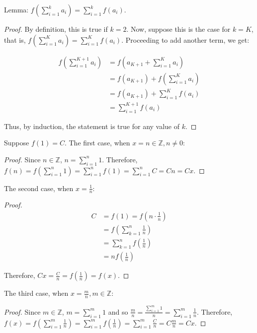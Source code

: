 
Lemma: $f\left(\sum_{i = 1}^k a_i\right) = \sum_{i = 1}^k f(a_i)$.
\begin{proof}
  By definition, this is true if $k = 2$. Now, suppose this is the case for $k = K$, that is, $f\left(\sum_{i = 1}^K a_i\right) = \sum_{i = 1}^K f(a_i)$. Proceeding to add another term, we get:

  \begin{align*}
    f\left(\sum_{i = 1}^{K + 1} a_i\right) &= f\left(a_{K + 1} + \sum_{i = 1}^K a_i\right) \\
    &= f(a_{K + 1}) + f\left(\sum_{i = 1}^K a_i\right) \\
    &= f(a_{K + 1}) + \sum_{i = 1}^K f(a_i) \\
    &= \sum_{i = 1}^{K + 1} f(a_i)
  \end{align*}

  Thus, by induction, the statement is true for any value of $k$.
\end{proof}

Suppose $f(1) = C$. The first case, when $x = n \in \mathbb{Z}, n \neq 0$:

\begin{proof}
  Since $n \in \mathbb{Z}$, $n = \sum_{i = 1}^n 1$. Therefore, $f(n) = f\left(\sum_{i = 1}^n 1\right) = \sum_{i = 1}^n f(1) = \sum_{i = 1}^n C = Cn = Cx$.
\end{proof}

The second case, when $x = \frac{1}{n}$:

\begin{proof}
  \begin{align*}
    C &= f(1) = f(n \cdot \frac{1}{n}) \\
    &= f\left(\sum_{k = 1}^n \frac{1}{n}\right) \\
    &= \sum_{k = 1}^n f\left(\frac{1}{n}\right) \\
    &= n f\left(\frac{1}{n}\right)
  \end{align*}

  Therefore, $Cx = \frac{C}{n} = f\left(\frac{1}{n}\right) = f(x)$.
\end{proof}

The third case, when $x = \frac{m}{n}, m \in \mathbb{Z}$:

\begin{proof}
  Since $m \in \mathbb{Z}$, $m = \sum_{i = 1}^m 1$ and so $\frac{m}{n} = \frac{\sum_{i = 1}^m 1}{n} = \sum_{i = 1}^m \frac{1}{n}$. Therefore, $f(x) = f\left(\sum_{i = 1}^m \frac{1}{n}\right) = \sum_{i = 1}^m f\left(\frac{1}{n}\right) = \sum_{i = 1}^m \frac{C}{n} = C\frac{m}{n} = Cx$.
\end{proof}


